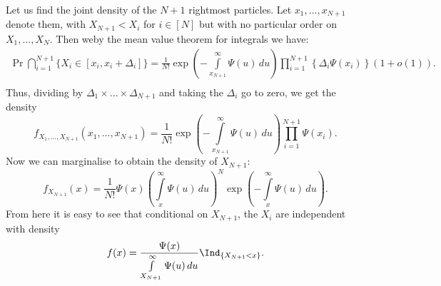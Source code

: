 Let us find the joint density of the $N+1$ rightmost particles. Let $x_1, ..., x_{N+1}$ denote them, with $X_{N+1} < X_i$ for $i \in [N]$ but with no particular order on $X_1, ..., X_N$. Then weby the mean value theorem for integrals we have: \\
\begin{align*}
\Pr{\bigcap\limits_{i = 1}^{N+1} \{ X_i \in [x_i, x_i + \Delta_i] \}} = \frac{1}{N!} \exp\left(-\int\limits_{x_{N+1}}^\infty \Psi(u)\,du\right) \prod\limits_{i = 1}^{N+1}\left\{ \Delta_i \Psi(x_i) \right\} (1 + o(1)). \\
\end{align*}
Thus, dividing by $\Delta_1 \times ... \times \Delta_{N+1}$ and taking the $\Delta_i$ go to zero, we get the density
\begin{equation*}
f_{X_1, ..., X_{N+1}}(x_1, ..., x_{N+1}) = \frac{1}{N!} \exp\left(-\int\limits_{x_{N+1}}^\infty \Psi(u)\,du\right) \prod\limits_{i = 1}^{N+1} \Psi(x_i).
\end{equation*}
Now we can marginalise to obtain the density of $X_{N+1}$:
\begin{equation*}
f_{X_{N+1}}(x) = \frac{1}{N!} \Psi(x) \left(\int\limits_x^\infty \Psi(u)\,du\right)^N \exp\left(-\int\limits_x^\infty \Psi(u)\,du\right). 
\end{equation*}
From here it is easy to see that conditional on $X_{N+1}$, the $X_i$ are independent with density
\begin{equation*}
f(x) = \frac{\Psi(x)}{\int\limits_{X_{N+1}}^\infty \Psi(u)\, du} \Ind_{\{X_{N+1} < x\}}. 
\end{equation*}

